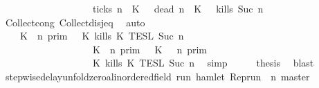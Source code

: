 \begin{isabellebody}
\ \ \ \ \ \ \ \ \ \ \ \ \ \ \ \ \ {\isasymunion}\ {\isacharbraceleft}{\isasymrho}{\isachardot}\ {\isacharquery}ticks\ n\ {\isasymrho}\ K\ {\isasyminter}\ {\isacharbraceleft}{\isasymrho}{\isachardot}\ {\isacharquery}dead\ n\ {\isasymrho}\ K\ {\isasyminter}\ {\isacharbraceleft}{\isasymrho}{\isachardot}\ {\isacharquery}kills\ {\isacharparenleft}Suc\ n{\isacharparenright}\ {\isasymrho}{\isacharbraceright}{\isacartoucheclose}\isanewline
\ \ \ \ \isamarkupfalse%
\ Collect{\isacharunderscore}cong\ Collect{\isacharunderscore}disj{\isacharunderscore}eq\ \isamarkupfalse%
\ auto\isanewline
\ \ \isamarkupfalse%
\ \isamarkupfalse%
\ {\isacartoucheopen}{\isachardot}{\isachardot}{\isachardot}\ {\isacharequal}\ {\isasymlbrakk}\ K\ {\isasymnot}{\isasymUp}\ n\ {\isasymrbrakk}\isactrlsub p\isactrlsub r\isactrlsub i\isactrlsub m\ {\isasyminter}\ {\isasymlbrakk}\ K\ kills\ K\ {\isasymrbrakk}\isactrlsub T\isactrlsub E\isactrlsub S\isactrlsub L\isactrlbsup {\isasymge}\ Suc\ n\isactrlesup \isanewline
\ \ \ \ \ \ \ \ \ \ \ \ \ \ \ \ \ {\isasymunion}\ {\isasymlbrakk}\ K\ {\isasymUp}\ n\ {\isasymrbrakk}\isactrlsub p\isactrlsub r\isactrlsub i\isactrlsub m\ {\isasyminter}\ {\isasymlbrakk}\ K\ {\isasymnot}{\isasymUp}\ {\isasymge}\ n\ {\isasymrbrakk}\isactrlsub p\isactrlsub r\isactrlsub i\isactrlsub m\isanewline
\ \ \ \ \ \ \ \ \ \ \ \ \ \ \ \ \ {\isasyminter}\ {\isasymlbrakk}\ K\ kills\ K\ {\isasymrbrakk}\isactrlsub T\isactrlsub E\isactrlsub S\isactrlsub L\isactrlbsup {\isasymge}\ Suc\ n\isactrlesup {\isacartoucheclose}\ \isamarkupfalse%
\ simp\isanewline
\ \ \isamarkupfalse%
\ \isamarkupfalse%
\ {\isacharquery}thesis\ \isamarkupfalse%
\ blast\isanewline
{}\isamarkupfalse%
%
\endisatagproof
{\isafoldproof}%
%
\isadelimproof
\isanewline
%
\endisadelimproof
\isanewline
{}\isamarkupfalse%
\ stepwise{\isacharunderscore}delay{\isacharunderscore}unfold{\isacharunderscore}zero{\isacharcolon}{\isacartoucheopen}{\isacharbraceleft}{\isasymrho}{\isacharcolon}{\isacharcolon}{\isacharparenleft}{\isacharprime}a{\isacharcolon}{\isacharcolon}linordered{\isacharunderscore}field{\isacharparenright}\ run{\isachardot}\ hamlet\ {\isacharparenleft}Rep{\isacharunderscore}run\ {\isasymrho}\ n\ master{\isacharparenright}\ \isanewline

\end{isabellebody}
